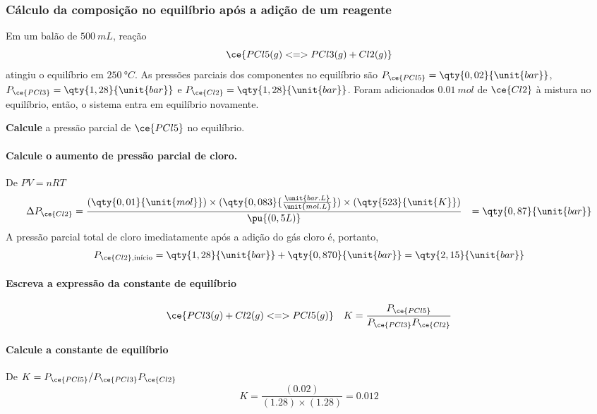 \begin{example}

\subsubsection{Cálculo da composição no equilíbrio após a adição de um reagente}

Em um balão de \(\qty{500}{\unit{mL}}\), reação \[
    \ce{ PCl5(g) <=> PCl3(g) + Cl2(g) }
\] atingiu o equilíbrio em \(\qty{250}{\unit{\degree C}}\). As pressões parciais dos componentes no equilíbrio são
\(P_{\ce{PCl5}} = \qty{0,02}{\unit{bar}}\), \(P_{\ce{PCl3}} = \qty{1,28}{\unit{bar}}\) e \(P_{\ce{Cl2}} = \qty{1,28}{\unit{bar}}\). Foram adicionados
\(\qty{0,01}{\unit{mol}}\) de \(\ce{Cl2}\) à mistura no equilíbrio, então, o sistema entra em equilíbrio novamente.

\textbf{Calcule} a pressão parcial de \(\ce{PCl5}\) no equilíbrio.

\paragraph{Calcule o aumento de pressão parcial de cloro.}

De \(PV = nRT\) \[
\begin{aligned}
    \Delta P_{\ce{Cl2}} 
        &= \dfrac{ (\qty{0,01}{\unit{mol}}) \times (\qty{0,083}{\tfrac{\unit{bar.L}}{\unit{mol.L}}}) \times (\qty{523}{\unit{K}}) }{ \pu{(0,5 L)} }
        &= \qty{0,87}{\unit{bar}}
\end{aligned}
\] A pressão parcial total de cloro imediatamente após a adição do gás cloro é, portanto, \[
    P_{\ce{Cl2}, \text{início}} = \qty{1,28}{\unit{bar}} + \qty{0,870}{\unit{bar}} = \qty{2,15}{\unit{bar}}
\]

\paragraph{Escreva a expressão da constante de equilíbrio}

\[
    \ce{ PCl3(g) + Cl2(g) <=> PCl5(g) } 
        \quad K = \dfrac{ P_{\ce{PCl5}} }{ P_{\ce{PCl3}} P_{\ce{Cl2}} }
\]

\paragraph{Calcule a constante de equilíbrio}

De \(K = P_{\ce{PCl5}} / P_{\ce{PCl3}} P_{\ce{Cl2}}\) \[
    K = \dfrac{ (\num{0,02}) }{ (\num{1,28}) \times (\num{1,28}) } = \num{0,012}
\]


\end{example}
